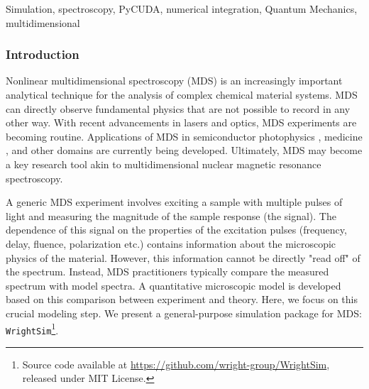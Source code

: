 Simulation, spectroscopy, PyCUDA, numerical integration, Quantum
Mechanics, multidimensional

\hypertarget{introduction}{%
\subsubsection{Introduction}\label{introduction}}

Nonlinear multidimensional spectroscopy (MDS) is an increasingly
important analytical technique for the analysis of complex chemical
material systems. MDS can directly observe fundamental physics that are
not possible to record in any other way. With recent advancements in
lasers and optics, MDS experiments are becoming routine. Applications of
MDS in semiconductor photophysics \cite{CzechKyleJonathan2015a}, medicine
\cite{Fournier_2009}, and other domains \cite{Petti_2018} are
currently being developed. Ultimately, MDS may become a key research
tool akin to multidimensional nuclear magnetic resonance spectroscopy.
\cite{PakoulevAndreiV2009a}

A generic MDS experiment involves exciting a sample with multiple pulses
of light and measuring the magnitude of the sample response (the
signal). The dependence of this signal on the properties of the
excitation pulses (frequency, delay, fluence, polarization etc.)
contains information about the microscopic physics of the material.
However, this information cannot be directly "read off" of the spectrum.
Instead, MDS practitioners typically compare the measured spectrum with
model spectra. A quantitative microscopic model is developed based on
this comparison between experiment and theory. Here, we focus on this
crucial modeling step. We present a general-purpose simulation package
for MDS: \texttt{WrightSim}\footnote{Source code available at
  \url{https://github.com/wright-group/WrightSim}, released under MIT
  License.}.

